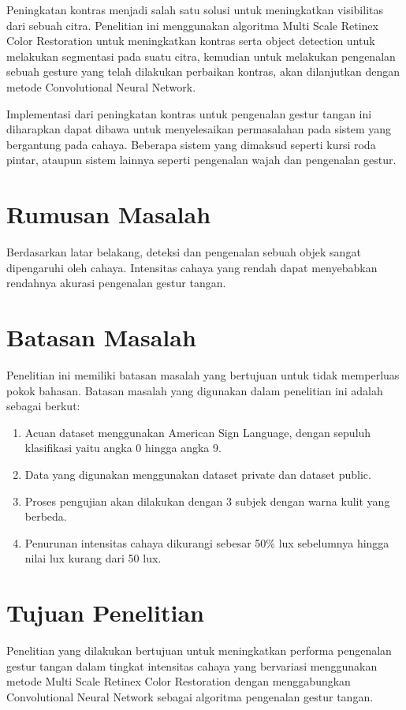 Peningkatan kontras menjadi salah satu solusi untuk meningkatkan visibilitas dari sebuah citra. Penelitian ini menggunakan algoritma Multi Scale Retinex Color Restoration untuk meningkatkan kontras serta object detection untuk melakukan segmentasi pada suatu citra, kemudian untuk melakukan pengenalan sebuah gesture yang telah dilakukan perbaikan kontras, akan dilanjutkan dengan metode Convolutional Neural Network. 

Implementasi dari peningkatan kontras untuk pengenalan gestur tangan ini diharapkan dapat dibawa untuk menyelesaikan permasalahan pada sistem yang bergantung pada cahaya. Beberapa sistem yang dimaksud seperti kursi roda pintar, ataupun sistem lainnya seperti pengenalan wajah dan pengenalan gestur. 
\section{Rumusan Masalah}
Berdasarkan latar belakang, deteksi dan pengenalan sebuah objek sangat dipengaruhi oleh cahaya.
Intensitas cahaya yang rendah dapat menyebabkan rendahnya akurasi pengenalan gestur tangan.
\section{Batasan Masalah} 

Penelitian ini memiliki batasan masalah yang bertujuan untuk tidak memperluas pokok bahasan. Batasan masalah yang digunakan dalam penelitian ini adalah sebagai berkut:
\begin{enumerate}
\item Acuan dataset menggunakan American Sign Language, dengan sepuluh klasifikasi yaitu angka 0 hingga angka 9.
\item Data yang digunakan menggunakan dataset private dan dataset public.
\item Proses pengujian akan dilakukan dengan 3 subjek dengan warna kulit yang berbeda.
\item Penurunan intensitas cahaya dikurangi sebesar 50\% lux sebelumnya hingga nilai lux kurang dari 50 lux.
\end{enumerate}
\section{Tujuan Penelitian}
Penelitian yang dilakukan bertujuan untuk meningkatkan performa pengenalan gestur tangan 
dalam tingkat intensitas cahaya yang bervariasi menggunakan metode Multi Scale Retinex Color Restoration dengan menggabungkan Convolutional Neural Network
sebagai algoritma pengenalan gestur tangan.

